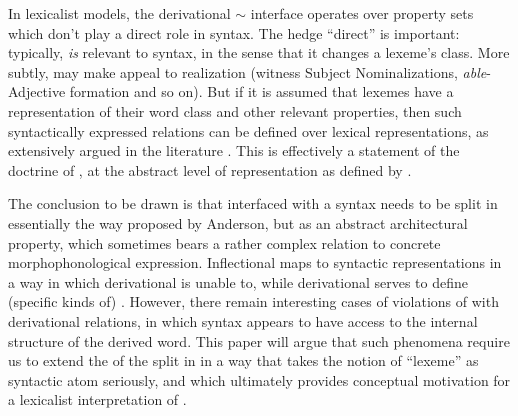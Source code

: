 \documentclass[output=paper,
modfonts
]{LSP/langsci}
\begin{document}
 In lexicalist models, the derivational  $\sim$  interface operates over property sets which don’t play a direct role in syntax. The hedge ``direct'' is important: typically,  \emph{is} relevant to syntax, in the sense that it changes a lexeme’s  class. More subtly,  may make appeal to  realization (witness  Subject Nominalizations, \emph{able}-Adjective formation and so on). But if it is assumed that lexemes have a representation of their word class  and other relevant properties, then such syntactically expressed
relations can be defined over lexical representations, as extensively argued in the  literature  %
\parencite[see][for a review]{Wechsler14:book}.
This is effectively a statement of the doctrine of ,	
at the abstract level of representation as defined by %
\citet{Ackerman:LeSourd97}.

The conclusion to be drawn is that  interfaced with a  syntax needs to be split in essentially the way proposed by Anderson, but as an abstract architectural property, which sometimes bears a rather complex relation to concrete morphophonological expression. Inflectional  maps to syntactic representations in a way in which derivational  is unable to, while derivational  serves to define (specific kinds of) . However, there remain interesting cases of violations of  with derivational relations, in which syntax appears to have access to the internal structure of the derived word.  This paper will argue that such phenomena require us to extend the  of the split in  in a way that takes the notion of ``lexeme'' as syntactic atom seriously, and which ultimately provides conceptual motivation for a lexicalist interpretation of . 
\end{document}
